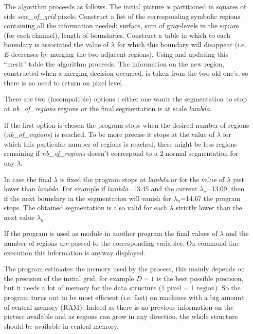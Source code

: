 The algorithm proceeds as follows. 
The initial picture is partitioned in squares of side {\em size\_of\_grid}
pixels. 
Construct a list of the corresponding 
symbolic regions containing all the information needed: surface, sum 
of gray-levels in the square (for each channel), length of boundaries.
Construct a table in which to each boundary is associated the 
value of $\lambda$ for which this boundary will disappear (i.e.
 $E$ decreases by merging the two adjacent regions).
Using and updating this ``merit'' table the algorithm proceeds.
The information on the new region, constructed when a merging decision occurred,
 is taken
from the two old one's, so there is no need to return on pixel level.

There are two (incompatible) options : either one wants the segmentation
to stop at {\em nb\_of\_regions} regions or the final segmentation is
at scale {\em lambda}.

If the first option is chosen the program stops when the desired 
number of regions ({\em nb\_of\_regions})
is reached. To be more precise it stops at the value of $\lambda$ for which
 this particular number of regions is reached, there might be less regions
remaining if {\em nb\_of\_regions} doesn't correspond to a 2-normal 
segmentation for any $\lambda$.

In case the final $\lambda$ is fixed the program stops at {\em lambda} or
for the value of $\lambda$ just lower than {\em lambda}. For example if
{\em lambda}=13.45 and the current $\lambda_c$=13.09, then if the next
boundary in the segmentation will vanish for $\lambda_n$=14.67 the program
stops. The obtained segmentation is also valid for each $\lambda$ strictly
lower than the next value $\lambda_n$.

If the program is used as module in another program the final values
of $\lambda$ and the number of regions are passed to the corresponding
variables. On command line execution this information is anyway displayed.

The program estimates the memory used by the process, this mainly depends
on the precision of the initial grid, for example $D=1$ is the best possible
precision, but it needs a lot of memory for the data structure 
(1 pixel = 1 region). So the program turns out to be most efficient 
(i.e. fast) on machines with a big amount of central memory (RAM). 
Indeed as there
is no previous information on the picture available and as regions can grow
in any direction, the whole structure should be available in central memory.


